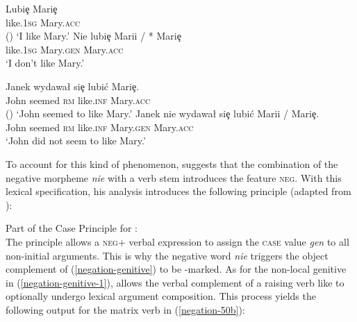 \documentclass[output=paper
 	        ,biblatex
                ,babelshorthands
                ,newtxmath
                ,draftmode
                ,colorlinks, citecolor=brown
]{langscibook}
\begin{document}
\begin{exe}
\begin{xlist}
\begin{exe}
\begin{xlist}
\eal
\ex  \label{negation-genitive}
\gll Lubi\c{e} Mari\c{e} \\
     like.1\textsc{sg} Mary.\textsc{acc}\\\hfill()
\glt `I like Mary.'
\ex \label{negation-49b}
\gll Nie lubi\c{e} Marii / * Mari\c{e} \\
     \NEG{} like.1\textsc{sg} Mary.\textsc{gen} {} {} Mary.\textsc{acc}\\
\glt `I don't like Mary.'
\zl

\eal
\ex \label{negation-genitive-1}
\gll  Janek wydawa\l{} si\c{e} lubi\'{c} Mari\c{e}.\\
      John seemed \textsc{rm}     like.\textsc{inf} Mary.\textsc{acc}\\\hfill()
\glt `John seemed to like Mary.'
\ex \label{negation-50b}
\gll  Janek nie wydawa\l{} si\c{e} lubi\'{c} Marii / Mari\c{e}.\\
      John \NEG{} seemed \textsc{rm} like.\textsc{inf}      Mary.\textsc{gen} {} Mary.\textsc{acc}\\
\glt `John did not seem to like Mary.'
\zl

\noindent
To account for this kind of phenomenon, \citet{Prz:00}
suggests that the combination of the
negative morpheme \emph{nie} with a verb stem introduces the
feature \textsc{neg}.
With this lexical specification, his analysis introduces
 the following principle (adapted from \citealt[]{Prz:00}):

\ea
\label{negation-polish-gen-case}
Part of the Case Principle for :\\
  \impl
{}
\z
The principle allows a \textsc{neg}+ verbal expression to assign
 the \textsc{case} value \textit{gen} to all
non-initial arguments.
%
This is why the negative word \emph{nie} triggers the object complement of
(\ref{negation-genitive}) to be \GEN-marked.
As for the non-local genitive in (\ref{negation-genitive-1}), \citet[]{Prz:00}
allows the verbal complement of a raising verb like  to optionally undergo lexical
argument composition. This process yields the following output for the
matrix verb in (\ref{negation-50b}):


\end{xlist}
\end{exe}
\end{xlist}
\end{exe}
\end{document}
